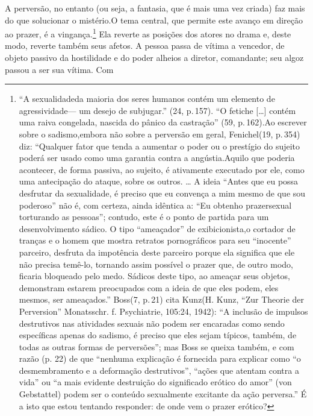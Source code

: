 A perversão, no entanto (ou seja, a fantasia, que é mais uma vez
criada) faz mais do que solucionar o mistério.\idxfanta[|)] O tema central, que
permite este avanço em direção ao prazer,\idxvinga{} é a vingança.\footnote{ ``A sexualidade\idxsexuateo[|nn] da maioria dos seres humanos
contém um elemento de agressividade\idxagres[|nn] --- um desejo de
subjugar.'' (24, p.\,157). ``O fetiche [\ldots{}]
contém uma raiva congelada, nascida do pânico da
castração'' (59, p.\,162).\idxfreudsexua[|nn] Ao escrever sobre o sadismo,\idxsadiangu[|nn]
embora não sobre a perversão em geral, Fenichel\idxfenic[|nn] (19, p.\,354) diz:
``Qualquer fator que tenda a aumentar o poder ou o
prestígio do sujeito poderá ser usado como uma garantia contra a
angústia.\idxangu[|nn] Aquilo que poderia acontecer, de forma passiva, ao sujeito, é
ativamente executado por ele, como uma antecipação do ataque, sobre os
outros. \ldots{} A ideia
``Antes que eu possa desfrutar da sexualidade, é
preciso que eu convença a mim mesmo de que sou
poderoso'' não é, com certeza, ainda idêntica a:
``Eu obtenho prazer\idxpraz[|nn] sexual torturando as
pessoas''; contudo, este é o ponto de partida para um
desenvolvimento sádico. O tipo
``ameaçador'' de exibicionista,\idxexibi[|nn] o
cortador de tranças e o homem que mostra retratos pornográficos para
seu ``inocente'' parceiro, desfruta da
impotência deste parceiro porque ela significa que ele não precisa
temê-lo, tornando assim possível o prazer que, de outro modo, ficaria
bloqueado pelo medo. Sádicos deste tipo, ao ameaçar seus objetos,
demonstram estarem preocupados com a ideia de que eles podem, eles
mesmos, ser ameaçados.'' Boss\idxboss[|nn] (7, p.\,21) cita Kunz\idxkunz[|nn] (H. Kunz,
``Zur Theorie der Perversion'' Monatsschr. f. Psychiatrie, 105:24, 1942):
``A inclusão de impulsos destrutivos nas atividades sexuais não podem
ser encaradas como sendo específicas apenas do sadismo, é preciso que eles
sejam típicos, também, de todas as outras formas de perversões''; mas
Boss se queixa também, e com razão (p. 22) de que ``nenhuma explicação
é fornecida para explicar como ``o desmembramento e a deformação destrutivos'',
``ações que atentam contra a vida'' ou ``a mais evidente destruição do
significado erótico do amor'' (von Gebstattel) podem ser o conteúdo
sexualmente excitante da ação perversa.'' É a isto que estou tentando responder:
de onde vem o prazer erótico?} Ela reverte as posições dos
atores no drama e, deste modo, reverte também seus afetos. A pessoa
passa de vítima a vencedor, de objeto passivo da hostilidade e do poder
alheios a diretor, comandante; seu algoz passou a ser sua vítima. Com
